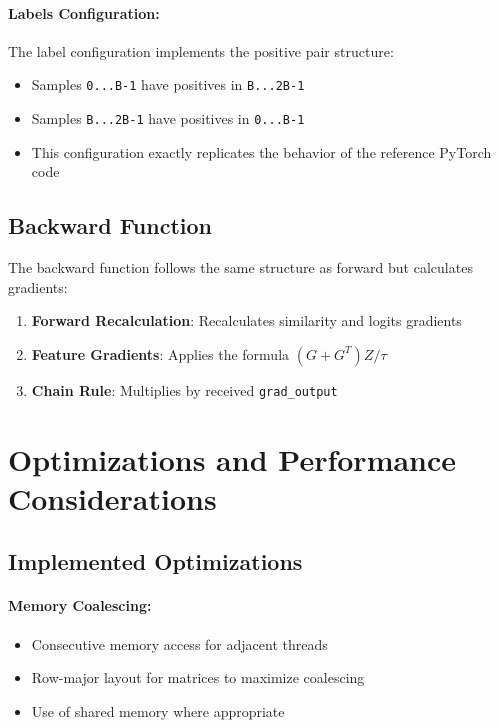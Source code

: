 \documentclass[a4paper,11pt]{article}
\begin{document}
\paragraph{Labels Configuration:}
The label configuration implements the positive pair structure:
\begin{itemize}
    \item Samples \texttt{0...B-1} have positives in \texttt{B...2B-1}
    \item Samples \texttt{B...2B-1} have positives in \texttt{0...B-1}
    \item This configuration exactly replicates the behavior of the reference PyTorch code
\end{itemize}

\subsection{Backward Function}

The backward function follows the same structure as forward but calculates gradients:

\begin{enumerate}
    \item \textbf{Forward Recalculation}: Recalculates similarity and logits gradients
    \item \textbf{Feature Gradients}: Applies the formula $(G + G^T) Z / \tau$
    \item \textbf{Chain Rule}: Multiplies by received \texttt{grad\_output}
\end{enumerate}

\section{Optimizations and Performance Considerations}

\subsection{Implemented Optimizations}

\paragraph{Memory Coalescing:}
\begin{itemize}
    \item Consecutive memory access for adjacent threads
    \item Row-major layout for matrices to maximize coalescing
    \item Use of shared memory where appropriate
\end{itemize}
\end{document}
